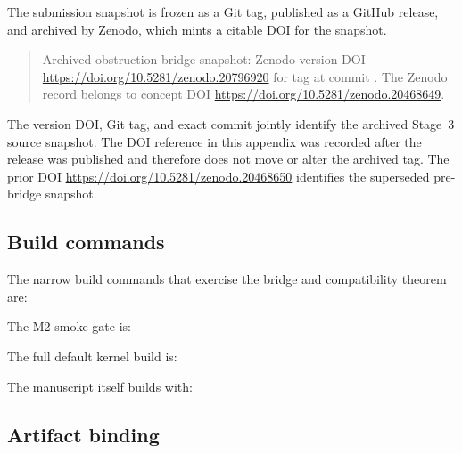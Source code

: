 The submission snapshot is frozen as a Git tag, published as a GitHub release, and archived by Zenodo, which mints a citable DOI for the snapshot.

\begin{quote}
Archived obstruction-bridge snapshot:
Zenodo version DOI
\url{https://doi.org/10.5281/zenodo.20796920}
for tag
at commit
.
The Zenodo record belongs to concept DOI
\url{https://doi.org/10.5281/zenodo.20468649}.
\end{quote}

The version DOI, Git tag, and exact commit jointly identify the archived
Stage~3 source snapshot. The DOI reference in this appendix was recorded after
the release was published and therefore does not move or alter the archived
tag. The prior DOI \url{https://doi.org/10.5281/zenodo.20468650} identifies the
superseded pre-bridge  snapshot.

\subsection{Build commands}
\label{sec:build-commands}

The narrow build commands that exercise the bridge and compatibility theorem are:
\begin{quote}
\end{quote}
\begin{quote}
\end{quote}

The M2 smoke gate is:
\begin{quote}
\end{quote}

The full default kernel build is:
\begin{quote}
\end{quote}

The manuscript itself builds with:
\begin{quote}
\end{quote}

\subsection{Artifact binding}
\label{sec:artifact-binding}

